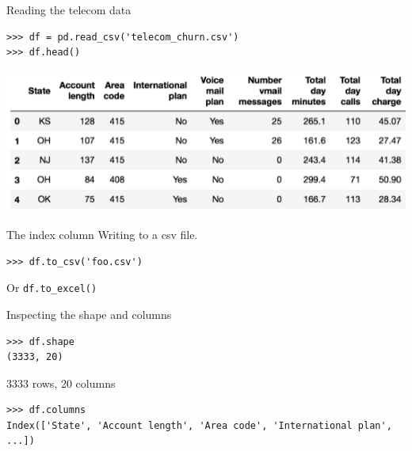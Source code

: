\documentclass[aspectratio=169,usenames,dvipsnames]{beamer}
\begin{document}
\begin{frame}[fragile]{Reading the telecom data}
\begin{lstlisting}
>>> df = pd.read_csv('telecom_churn.csv')
>>> df.head()
\end{lstlisting}

\includegraphics[width=0.9\linewidth]{fig/telecom}

\end{frame}


\begin{frame}[fragile]{The index column}
Writing to a csv file.

\begin{lstlisting}
>>> df.to_csv('foo.csv')
\end{lstlisting}
Or \texttt{df.to\_excel()}
\end{frame}


\begin{frame}[fragile]{Inspecting the shape and columns}
\begin{lstlisting}
>>> df.shape
(3333, 20)
\end{lstlisting}

3333 rows, 20 columns

\begin{lstlisting}
>>> df.columns
Index(['State', 'Account length', 'Area code', 'International plan', ...])
\end{lstlisting}
\end{frame}
\end{document}
